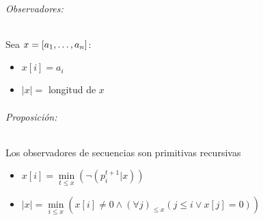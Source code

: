 \paragraph{Observadores:} Sea $x=[a_1,\dots, a_{n}]$:
\begin{itemize}
	\item $x[i] = a_i$
	\item $|x| =$ longitud de $x$
\end{itemize}

\paragraph{Proposición:} Los observadores de secuencias son primitivas recursivas

\begin{demo}
	\begin{itemize}
		\item $x[i] = \min\limits_{t\leq x}\left(\lnot\left(p_i^{t+1}|x\right)\right)$
		\item $|x| = \min\limits_{i\leq x}\left(x[i]\neq 0 \land \left(\forall j\right)_{\leq x} \left(j\leq i \lor x[j] = 0\right)\right)$
	\end{itemize}
\end{demo}
	\section{}
	
	\section{}
	
	\part{}
	
	\section{}
	
	\section{}
	
	\section{}
	
